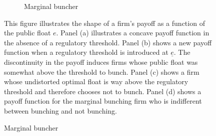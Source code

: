 \begin{figure}[ht]
\begin{center}
\begin{subfigure}{0.48\textwidth}
			
			\caption{Marginal buncher}\label{fig:marginal_buncher}
		\end{subfigure}
		
		\label{fig:bunching_explained}
	\end{center}
	{\small{}This figure illustrates the shape of a firm's payoff as a function of the public float $e$. Panel (a) illustrates a concave payoff function in the absence of a regulatory threshold. Panel (b) shows a new payoff function when a regulatory threshold is introduced at  $\underline{e}$. The discontinuity in the payoff induces firms whose public float was somewhat above the threshold to bunch. Panel (c) shows a firm whose undistorted optimal float is way above the regulatory threshold and therefore chooses not to bunch. Panel (d) shows a payoff function for the marginal bunching firm who is indifferent between bunching and not bunching. } {\small\par}
\end{figure}